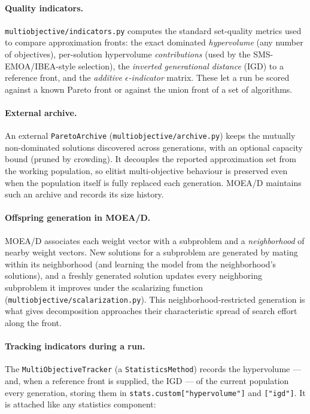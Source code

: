 \documentclass[a4paper,11pt]{article}
\begin{document}
\paragraph{Quality indicators.} \texttt{multiobjective/indicators.py} computes the
standard set-quality metrics used to compare approximation fronts: the exact
dominated \emph{hypervolume} (any number of objectives), per-solution hypervolume
\emph{contributions} (used by the SMS-EMOA/IBEA-style selection), the
\emph{inverted generational distance} (IGD) to a reference front, and the
\emph{additive $\epsilon$-indicator} matrix. These let a run be scored against a
known Pareto front or against the union front of a set of algorithms.

\paragraph{External archive.} An external \texttt{ParetoArchive}
(\texttt{multiobjective/archive.py}) keeps the mutually non-dominated solutions
discovered across generations, with an optional capacity bound (pruned by
crowding). It decouples the reported approximation set from the working
population, so elitist multi-objective behaviour is preserved even when the
population itself is fully replaced each generation. MOEA/D maintains such an
archive and records its size history.

\paragraph{Offspring generation in MOEA/D.} MOEA/D associates each weight vector
with a subproblem and a \emph{neighborhood} of nearby weight vectors. New
solutions for a subproblem are generated by mating within its neighborhood (and
learning the model from the neighborhood's solutions), and a freshly generated
solution updates every neighboring subproblem it improves under the scalarizing
function (\texttt{multiobjective/scalarization.py}). This neighborhood-restricted
generation is what gives decomposition approaches their characteristic spread of
search effort along the front.

\paragraph{Tracking indicators during a run.} The
\texttt{MultiObjectiveTracker} (a \texttt{StatisticsMethod}) records the
hypervolume --- and, when a reference front is supplied, the IGD --- of the
current population every generation, storing them in
\texttt{stats.custom["hypervolume"]} and \texttt{["igd"]}. It is attached like any
statistics component:
\end{document}
